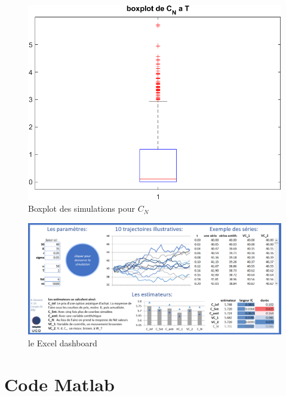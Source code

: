 \documentclass[a4paper,12pt]{scrartcl}
\begin{document}
\begin{figure}[h!]
  \begin{center}
    \includegraphics[width=14cm]{"graphiques/box_C_N.png"}
    \caption{Boxplot des simulations pour $C_{N}$}
    \label{fig:box_C_N}
  \end{center}
\end{figure}

\begin{figure}[h!]
  \begin{center}
    \includegraphics[width=14cm]{"graphiques/Capture.PNG"}
    \caption{le Excel dashboard}
    \label{fig:capture}
  \end{center}
\end{figure}


\section{Code Matlab}

\end{document}
